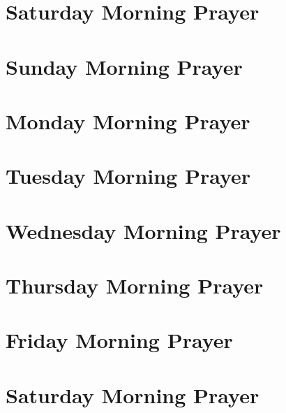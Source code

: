 \documentclass[12pt,twocolumn]{book}
\begin{document}
\section{Saturday Morning Prayer}



\section{Sunday Morning Prayer}


\section{Monday Morning Prayer}


\section{Tuesday Morning Prayer}


\section{Wednesday Morning Prayer}


\section{Thursday Morning Prayer}


\section{Friday Morning Prayer}


\section{Saturday Morning Prayer}

\end{document}
